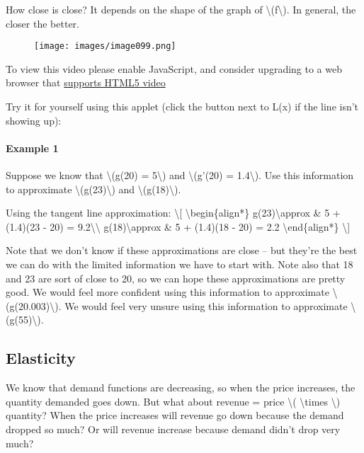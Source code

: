 How close is close? It depends on the shape of the graph of
\textbackslash{}(f\textbackslash{}). In general, the closer the better.

\begin{figure}
\centering
\texttt{[image: images/image099.png]}
\caption{}
\end{figure}

To view this video please enable JavaScript, and consider upgrading to a
web browser that \href{http://videojs.com/html5-video-support/}{supports
HTML5 video}

Try it for yourself using this applet (click the button next to L(x) if
the line isn't showing up):

\hypertarget{applet_container}{}

\hypertarget{example-1}{%
\paragraph{Example 1}\label{example-1}}

Suppose we know that \textbackslash{}(g(20) = 5\textbackslash{}) and
\textbackslash{}(g'(20) = 1.4\textbackslash{}). Use this information to
approximate \textbackslash{}(g(23)\textbackslash{}) and
\textbackslash{}(g(18)\textbackslash{}).

Using the tangent line approximation: \textbackslash{}{[}
\textbackslash{}begin\{align*\} g(23)\textbackslash{}approx \& 5 +
(1.4)(23 - 20) = 9.2\textbackslash{}\textbackslash{}
g(18)\textbackslash{}approx \& 5 + (1.4)(18 - 20) = 2.2
\textbackslash{}end\{align*\} \textbackslash{}{]}

Note that we don't know if these approximations are close -- but they're
the best we can do with the limited information we have to start with.
Note also that 18 and 23 are sort of close to 20, so we can hope these
approximations are pretty good. We would feel more confident using this
information to approximate \textbackslash{}(g(20.003)\textbackslash{}).
We would feel very unsure using this information to approximate
\textbackslash{}(g(55)\textbackslash{}).

\hypertarget{elasticity}{%
\subsection{Elasticity}\label{elasticity}}

We know that demand functions are decreasing, so when the price
increases, the quantity demanded goes down. But what about revenue =
price \textbackslash{}( \textbackslash{}times \textbackslash{})
quantity? When the price increases will revenue go down because the
demand dropped so much? Or will revenue increase because demand didn't
drop very much?

